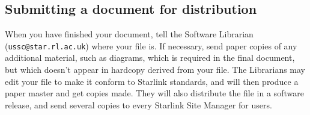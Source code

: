 \documentclass[twoside,11pt]{article}
\begin{document}
\subsection{Submitting a document for distribution}

When you have finished your document, tell the Software Librarian
({\tt ussc@star.rl.ac.uk}) where your file is.
If necessary, send paper copies of any additional material, such as diagrams,
which is required in the final document, but which doesn't appear in hardcopy
derived from your file.
The Librarians may edit your file to make it conform to Starlink standards, and
will then produce a paper master and get copies made.
They will also distribute the file in a software release, and send several
copies to every Starlink Site Manager for users.
\end{document}
